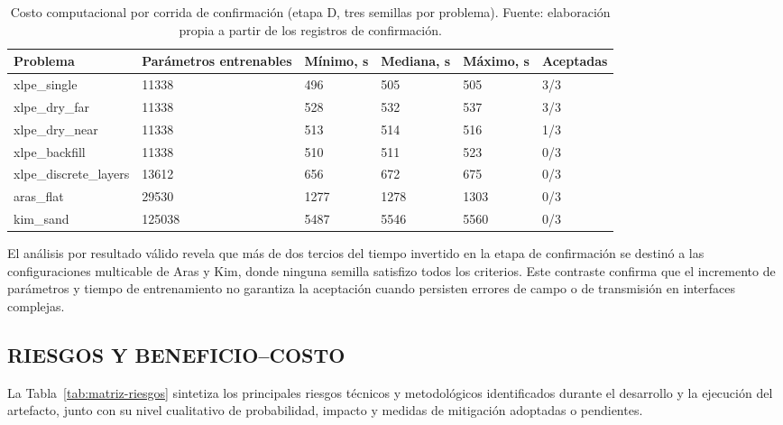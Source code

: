\begin{table}[htbp]
\centering
\caption{Costo computacional por corrida de confirmación (etapa D, tres semillas por problema). Fuente: elaboración propia a partir de los registros de confirmación.}
\label{tab:costo-computacional}
\begin{tabularx}{\textwidth}{L{3.6cm}C{2.2cm}C{1.7cm}C{1.7cm}C{1.7cm}Y}
\toprule
Problema & Parámetros entrenables & Mínimo, s & Mediana, s & Máximo, s & Aceptadas \\
\midrule
xlpe\_single & 11338 & 496 & 505 & 505 & 3/3 \\
xlpe\_dry\_far & 11338 & 528 & 532 & 537 & 3/3 \\
xlpe\_dry\_near & 11338 & 513 & 514 & 516 & 1/3 \\
xlpe\_backfill & 11338 & 510 & 511 & 523 & 0/3 \\
xlpe\_discrete\_layers & 13612 & 656 & 672 & 675 & 0/3 \\
aras\_flat & 29530 & 1277 & 1278 & 1303 & 0/3 \\
kim\_sand & 125038 & 5487 & 5546 & 5560 & 0/3 \\
\bottomrule
\end{tabularx}
\end{table}

El análisis por resultado válido revela que más de dos tercios del tiempo invertido en la etapa de confirmación se destinó a las configuraciones multicable de Aras y Kim, donde ninguna semilla satisfizo todos los criterios. Este contraste confirma que el incremento de parámetros y tiempo de entrenamiento no garantiza la aceptación cuando persisten errores de campo o de transmisión en interfaces complejas.

\subsection{RIESGOS Y BENEFICIO--COSTO}

La Tabla~\ref{tab:matriz-riesgos} sintetiza los principales riesgos técnicos y metodológicos identificados durante el desarrollo y la ejecución del artefacto, junto con su nivel cualitativo de probabilidad, impacto y medidas de mitigación adoptadas o pendientes.


